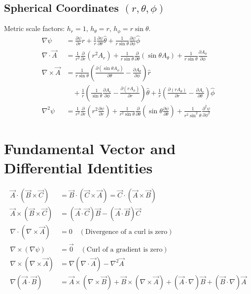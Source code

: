 \subsection{Spherical Coordinates $(r, \theta, \phi)$}
Metric scale factors: $h_r = 1, \, h_\theta = r, \, h_\phi = r\sin\theta$.
\begin{align}
\nabla \psi &= \frac{\partial \psi}{\partial r}\hat{r} + \frac{1}{r}\frac{\partial \psi}{\partial \theta}\hat{\theta} + \frac{1}{r\sin\theta}\frac{\partial \psi}{\partial \phi}\hat{\phi} \\
\nabla \cdot \vec{A} &= \frac{1}{r^2}\frac{\partial}{\partial r}(r^2 A_r) + \frac{1}{r\sin\theta}\frac{\partial}{\partial \theta}(\sin\theta A_\theta) + \frac{1}{r\sin\theta}\frac{\partial A_\phi}{\partial \phi} \\
\nabla \times \vec{A} &= \frac{1}{r\sin\theta}\left(\frac{\partial (\sin\theta A_\phi)}{\partial \theta} - \frac{\partial A_\theta}{\partial \phi}\right)\hat{r} \nonumber\\
&\quad + \frac{1}{r}\left(\frac{1}{\sin\theta}\frac{\partial A_r}{\partial \phi} - \frac{\partial (r A_\phi)}{\partial r}\right)\hat{\theta} + \frac{1}{r}\left(\frac{\partial (r A_\theta)}{\partial r} - \frac{\partial A_r}{\partial \theta}\right)\hat{\phi} \\
\nabla^2 \psi &= \frac{1}{r^2}\frac{\partial}{\partial r}\left(r^2\frac{\partial \psi}{\partial r}\right) + \frac{1}{r^2\sin\theta}\frac{\partial}{\partial \theta}\left(\sin\theta\frac{\partial \psi}{\partial \theta}\right) + \frac{1}{r^2\sin^2\theta}\frac{\partial^2 \psi}{\partial \phi^2}
\end{align}

\section{Fundamental Vector and Differential Identities}
\begin{align}
\vec{A} \cdot (\vec{B} \times \vec{C}) &= \vec{B} \cdot (\vec{C} \times \vec{A}) = \vec{C} \cdot (\vec{A} \times \vec{B}) \\
\vec{A} \times (\vec{B} \times \vec{C}) &= (\vec{A} \cdot \vec{C})\vec{B} - (\vec{A} \cdot \vec{B})\vec{C} \\
\nabla \cdot (\nabla \times \vec{A}) &= 0 \quad (\text{Divergence of a curl is zero}) \\
\nabla \times (\nabla \psi) &= \vec{0} \quad (\text{Curl of a gradient is zero}) \\
\nabla \times (\nabla \times \vec{A}) &= \nabla(\nabla \cdot \vec{A}) - \nabla^2 \vec{A} \\
\nabla (\vec{A} \cdot \vec{B}) &= \vec{A} \times (\nabla \times \vec{B}) + \vec{B} \times (\nabla \times \vec{A}) + (\vec{A} \cdot \nabla)\vec{B} + (\vec{B} \cdot \nabla)\vec{A}
\end{align}
